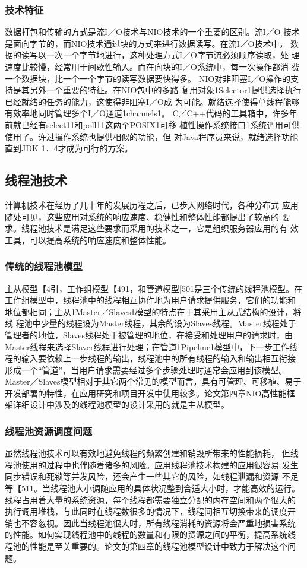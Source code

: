 \subsubsection*{技术特征}
数据打包和传输的方式是流I／O技术与NIO技术的一个重要的区别。流I／O
技术是面向字节的，而NIO技术通过块的方式来进行数据读写。在流I／O技术中，
数据的读写以一次一个字节地进行，这种处理方式I／O字节流必须顺序读取，处
理速度比较慢，经常用于间歇性输入。而在向块的I／O系统中，每一次操作都消
费一个数据块，比一个一个字节的读写数据要快得多。
NIO对非阻塞I／O操作的支持是其另外一个重要的特征。在NIO包中的多路
复用对象1Selector1提供选择执行已经就绪的任务的能力，这使得非阻塞I／O成
为可能。就绪选择使得单线程能够有效率地同时管理多个I／O通道1channels1。
C／C++代码的工具箱中，许多年前就已经有select11和poll11这两个POSIX1可移
植性操作系统接口1系统调用可供使用了。许过操作系统也提供相似的功能，但
对Java程序员来说，就绪选择功能直到JDK 1．4才成为可行的方案。
\subsection*{线程池技术}
计算机技术在经历了几十年的发展历程之后，已步入网络时代，各种分布式
应用随处可见，这些应用对系统的响应速度、稳健性和整体性能都提出了较高的
要求。线程池技术是满足这些要求而采用的技术之一，它是组织服务器应用的有
效工具，可以提高系统的响应速度和整体性能。
\subsubsection*{传统的线程池模型}
主从模型【4引，工作组模型【491，和管道模型[501是三个传统的线程池模型。在
工作组模型中，线程池中的线程相互协作地为用户请求提供服务，它们的功能和
地位都相同；主从1Master／Slaves1模型的特点在于其采用主从式结构的设计，将线
程池中少量的线程设为Master线程，其余的设为Slaves线程。Master线程处于
管理者的地位，Slaves线程处于被管理的地位，在接受和处理用户的请求时，由
Master线程来选择Slaver线程进行处理；在管道1Pipeline1模型中，下一步工作线
程的输入要依赖上一步线程的输出，线程池中的所有线程的输入和输出相互衔接
形成一个“管道”，当用户请求需要经过多个步骤处理时通常会应用到该模型。
Master／Slaves模型相对于其它两个常见的模型而言，具有可管理、可移植、易于
开发部署的特性，在应用研究和项目开发中使用较多。论文第四章NIO高性能框
架详细设计中涉及的线程池模型的设计采用的就是主从模型。
\subsubsection*{线程池资源调度问题}
虽然线程池技术可以有效地避免线程的频繁创建和销毁所带来的性能损耗，
但线程池使用的过程中也伴随着诸多的风险。应用线程池技术构建的应用很容易
发生同步错误和死锁等并发风险，还会产生一些其它的风险，如线程泄漏和资源
不足等【511。当线程池大小调随应用的具体状况整到合适大小时，才能高效的运行。
线程占用着大量的系统资源，每个线程都需要独立分配的内存空间和两个很大的
执行调用堆栈，与此同时在线程数很多的情况下，线程间相互切换带来的调度开
销也不容忽视。因此当线程池很大时，所有线程消耗的资源将会严重地损害系统
的性能。如何实现线程池中的线程的数量和有限的资源之间的平衡，提高系统线
程池的性能是至关重要的。论文的第四章的线程池模型设计中致力于解决这个问
题。
